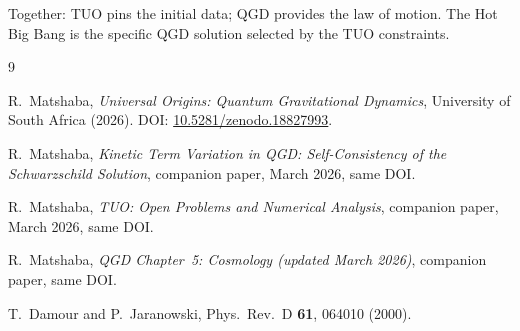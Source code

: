 \documentclass[11pt,a4paper]{article}
\theoremstyle{plain}
\theoremstyle{definition}
\theoremstyle{remark}
\begin{document}
Together: TUO pins the initial data; QGD provides the law of motion.
The Hot Big Bang is the specific QGD solution selected by the TUO
constraints.

\begin{thebibliography}{9}

R.~Matshaba,
\textit{Universal Origins: Quantum Gravitational Dynamics},
University of South Africa (2026).
DOI: \href{https://doi.org/10.5281/zenodo.18827993}{10.5281/zenodo.18827993}.

R.~Matshaba,
\textit{Kinetic Term Variation in QGD: Self-Consistency of the Schwarzschild
Solution}, companion paper, March 2026, same DOI.

R.~Matshaba,
\textit{TUO: Open Problems and Numerical Analysis},
companion paper, March 2026, same DOI.

R.~Matshaba,
\textit{QGD Chapter~5: Cosmology (updated March 2026)},
companion paper, same DOI.

T.~Damour and P.~Jaranowski,
Phys.\ Rev.\ D \textbf{61}, 064010 (2000).

\end{thebibliography}
\end{document}
